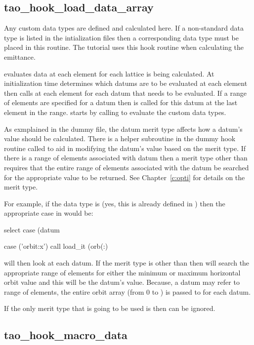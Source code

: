 \subsection{tao\_hook\_load\_data\_array}

Any custom data types are defined and calculated here. If a non-standard data
type is listed in the intialization files then a corresponding data type must
be placed in this routine. The tutorial uses this hook routine when
calculating the emittance. 

\tao evaluates data at each element for each lattice is being calculated. At
initialization time \tao determines which datums are to be evaluated at each
element then calls  at each element for each datum that
needs to be evaluated. If a range of elements are specified for a datum then
 is called for this datum at the last element in the
range.  starts by calling 
to evaluate the custom data types. 

As exmplained in the dummy file, the datum merit type
affects how a datum's value should be calculated. There is a helper subroutine
in the dummy hook routine called  to aid in modifying the datum's value based on the
merit type. If there is a range of elements associated with datum then a merit
type other than  requires that the entire range of elements
associated with the datum be searched for the appropriate value to be returned.
See Chapter~\ref{c:opti} for details on the merit type. 

For example, if the data type is  (yes, this is already defined in
\tao) then the appropriate case in  would be:
\begin{example}
select case (datum%

case ('orbit:x')
  call load_it (orb(:)%
\end{example}
 will then look at each datum. If the merit type is other than
 then  will search the appropriate range of elements for
either the minimum or maximum horizontal orbit value and this will be the
datum's value. Because, a datum may refer to range of elements, the entire orbit
array (from 0 to ) is passed to  for each  datum.

If the only merit type that is going to be used is  then 
can be ignored.

\subsection{tao\_hook\_macro\_data}

